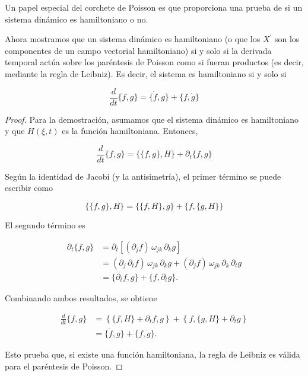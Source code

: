 Un papel especial del corchete de Poisson es que proporciona una prueba de si un sistema dinámico es hamiltoniano o no. 

\begin{proposition}
  Ahora mostramos que un sistema dinámico es hamiltoniano (o que los \(X^{\prime}\) son los componentes de un campo vectorial hamiltoniano) si y solo si la derivada temporal actúa sobre los paréntesis de Poisson como si fueran productos (es decir, mediante la regla de Leibniz). Es decir, el sistema es hamiltoniano si y solo si

\[
\frac{d}{d t}\{f, g\} = \{\dot{f}, g\} + \{f, \dot{g}\} \tag{5.62}
\]

\end{proposition}
\begin{proof}
  Para la demostración, asumamos que el sistema dinámico es hamiltoniano y que \( H(\xi, t) \) es la función hamiltoniana. Entonces,

\[
\frac{d}{d t}\{f, g\} = \{\{f, g\}, H\} + \partial_{t}\{f, g\}
\]

Según la identidad de Jacobi (y la antisimetría), el primer término se puede escribir como

\[
\{\{f, g\}, H\} = \{\{f, H\}, g\} + \{f, \{g, H\}\}
\]

El segundo término es

\[
\begin{aligned}
\partial_{t}\{f, g\} & = \partial_{t}\left[(\partial_j f) \, \omega_{j k} \, \partial_k g\right] \\
& = (\partial_j \, \partial_{t} f) \, \omega_{j k} \, \partial_k g + (\partial_j f) \, \omega_{j k} \, \partial_k \, \partial_{t} g \\
& = \{\partial_{t} f, g\} + \{f, \partial_{t} g\}.
\end{aligned}
\]

Combinando ambos resultados, se obtiene

\[
\begin{aligned}
\frac{d}{d t}\{f, g\} &= \left\{\{f, H\} + \partial_{t} f, g\right\} + \left\{f, \{g, H\} + \partial_{t} g\right\} \\
&= \{\dot{f}, g\} + \{f, \dot{g}\}.
\end{aligned}
\]

Esto prueba que, si existe una función hamiltoniana, la regla de Leibniz es válida para el paréntesis de Poisson.
\end{proof}

